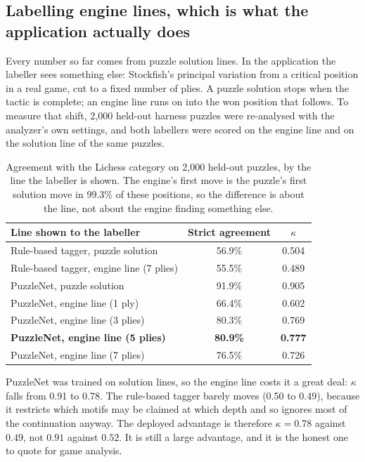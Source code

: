 \subsection{Labelling engine lines, which is what the application actually does}\label{sec:nn-deployment}

Every number so far comes from puzzle solution lines. In the application the labeller sees something
else: Stockfish's principal variation from a critical position in a real game, cut to a fixed number
of plies. A puzzle solution stops when the tactic is complete; an engine line runs on into the won
position that follows. To measure that shift, 2{,}000 held-out harness puzzles were re-analysed with
the analyzer's own settings, and both labellers were scored on the engine line and on the solution
line of the same puzzles.

\begin{table}[H]
\centering
\small
\caption{Agreement with the Lichess category on 2{,}000 held-out puzzles, by the line the labeller is
shown. The engine's first move is the puzzle's first solution move in 99.3\% of these positions, so
the difference is about the line, not about the engine finding something else.}\label{tab:nn-engine}
\begin{tabularx}{\linewidth}{Xcc}
\toprule
\textbf{Line shown to the labeller} & \textbf{Strict agreement} & \textbf{$\kappa$} \\
\midrule
Rule-based tagger, puzzle solution        & 56.9\% & 0.504 \\
Rule-based tagger, engine line (7 plies)  & 55.5\% & 0.489 \\
\midrule
PuzzleNet, puzzle solution                & 91.9\% & 0.905 \\
PuzzleNet, engine line (1 ply)            & 66.4\% & 0.602 \\
PuzzleNet, engine line (3 plies)          & 80.3\% & 0.769 \\
\textbf{PuzzleNet, engine line (5 plies)} & \textbf{80.9\%} & \textbf{0.777} \\
PuzzleNet, engine line (7 plies)          & 76.5\% & 0.726 \\
\bottomrule
\end{tabularx}
\end{table}

\begin{honest}
PuzzleNet was trained on solution lines, so the engine line costs it a great deal: $\kappa$ falls from
0.91 to 0.78. The rule-based tagger barely moves (0.50 to 0.49), because it restricts which motifs may
be claimed at which depth and so ignores most of the continuation anyway. The deployed advantage is
therefore $\kappa = 0.78$ against $0.49$, not $0.91$ against $0.52$. It is still a large advantage,
and it is the honest one to quote for game analysis.
\end{honest}

